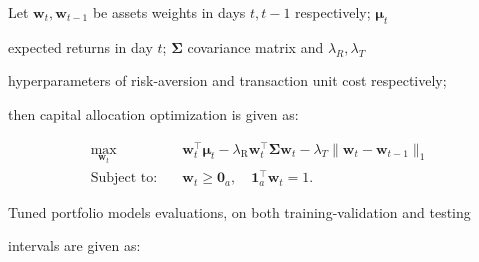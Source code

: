 \documentclass[
portrait,
a0paper%
]
{baposter}
\begin{document}
\begin{poster}
{  \hspace{0.3cm} Let $\mathbf{w}_{t}, \mathbf{w}_{t-1}$ be assets weights in days $t, t-1$ respectively; $\bm{\mu}_t$ 
  
  \hspace{0.3cm} expected returns in day $t$; $\bm{\Sigma}$ covariance matrix and $\lambda_R, \lambda_T$ 
  
  \hspace{0.3cm} hyperparameters of risk-aversion and transaction unit cost respectively; 
  
  \hspace{0.3cm} then capital allocation optimization is given as:

  \begin{equation*}
\begin{aligned}
\max_{\mathbf{w}_t} \quad 
& \mathbf{w}_t^{\top} \bm{\mu}_t 
- \lambda_{\mathrm{R}} \mathbf{w}_t^{\top} \bm{\Sigma} \mathbf{w}_t 
- \lambda_{T} \| \mathbf{w}_t - \mathbf{w}_{t-1} \|_1 \\
\text{Subject to:} \quad 
& \mathbf{w}_t \geq \mathbf{0}_a, \quad
\mathbf{1}_a^{\top} \mathbf{w}_t = 1.
\end{aligned}
\end{equation*}

\hspace{0.3cm} Tuned portfolio models evaluations, on both training-validation and testing

\hspace{0.3cm} intervals are given as:

\begin{table}[H]
\centering
{}
\end{table}}
\end{poster}
\end{document}
